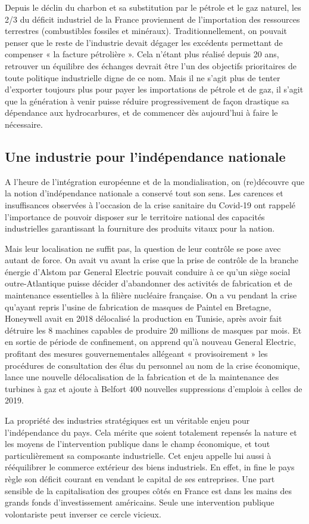 \documentclass[a4paper]{article}
\begin{document}
Depuis le déclin du charbon et  sa substitution par le pétrole et le gaz naturel, les 2/3 du déficit industriel de la France proviennent de l’importation des ressources terrestres (combustibles fossiles et minéraux). Traditionnellement, on pouvait penser que le reste de l’industrie devait dégager les excédents permettant de compenser « la facture pétrolière ». Cela n’étant plus réalisé depuis 20 ans, retrouver un équilibre des échanges devrait être l’un des objectifs prioritaires de toute politique industrielle digne de ce nom. Mais il ne s’agit plus de tenter d’exporter toujours plus pour payer les importations de pétrole et de gaz, il s’agit que la génération à venir puisse réduire progressivement de façon drastique sa dépendance aux hydrocarbures, et de commencer dès aujourd’hui à faire le nécessaire.


\subsection{Une industrie pour l’indépendance nationale}
A l’heure de l’intégration européenne et de la mondialisation, on (re)découvre que la notion d’indépendance nationale a conservé tout son sens. Les carences et insuffisances observées à l’occasion de la crise sanitaire du Covid-19 ont rappelé l’importance de pouvoir disposer sur le territoire national des capacités industrielles garantissant la fourniture des produits vitaux pour la nation. 

Mais leur localisation ne suffit pas, la question de leur contrôle se pose avec autant de force. On avait vu avant la crise que la prise de contrôle de la branche énergie d’Alstom par General Electric pouvait conduire à  ce qu’un siège social outre-Atlantique puisse décider d’abandonner des activités de fabrication et de maintenance essentielles à la filière nucléaire française. On a vu pendant la crise qu’ayant repris l’usine de fabrication de masques de Paintel en Bretagne, Honeywell avait en 2018 délocalisé la production en Tunisie, après avoir fait détruire les 8 machines capables de produire 20 millions de masques par mois. Et en sortie de période de confinement, on apprend qu’à nouveau General Electric, profitant des mesures gouvernementales allégeant « provisoirement » les procédures de consultation des élus du personnel au nom de la crise économique, lance une nouvelle délocalisation de la fabrication et de la maintenance des turbines à gaz et ajoute à Belfort 400 nouvelles suppressions d’emplois à celles de 2019.

La propriété des industries stratégiques est un véritable enjeu pour l’indépendance du pays. Cela mérite que soient totalement repensés la nature et les moyens de l’intervention publique dans le champ économique, et tout particulièrement sa composante industrielle.  Cet enjeu appelle lui aussi à rééquilibrer le commerce extérieur  des biens industriels. En effet, in fine le pays règle son déficit courant en vendant le capital de ses entreprises. Une part sensible de la capitalisation des groupes côtés en France est dans les mains des grands fonds d’investissement américains. Seule une intervention publique volontariste peut inverser ce cercle vicieux.
\end{document}
